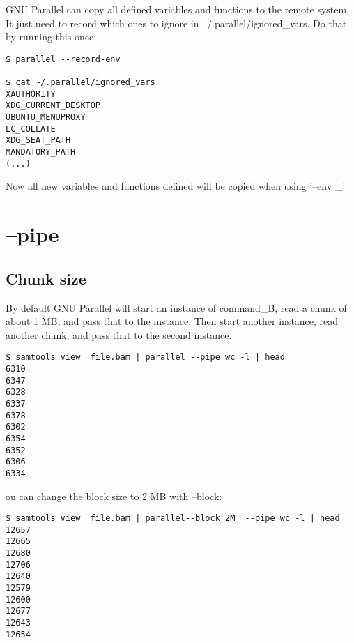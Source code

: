 \documentclass{article}
\begin{document}
GNU Parallel can copy all defined variables and functions to the remote system. It just need to record which ones to ignore in ~/.parallel/ignored\_vars. Do that by running this once:
\begin{lstlisting}
$ parallel --record-env

$ cat ~/.parallel/ignored_vars 
XAUTHORITY
XDG_CURRENT_DESKTOP
UBUNTU_MENUPROXY
LC_COLLATE
XDG_SEAT_PATH
MANDATORY_PATH
(...)
\end{lstlisting}
Now all new variables and functions defined will be copied when using  '--env \_'

%

\section{--pipe}
\subsection{Chunk size}
By default GNU Parallel will start an instance of command\_B, read a chunk of about 1 MB, and pass that to the instance. Then start another instance, read another chunk, and pass that to the second instance.
\begin{lstlisting}
$ samtools view  file.bam | parallel --pipe wc -l | head
6310
6347
6328
6337
6378
6302
6354
6352
6306
6334
\end{lstlisting}
ou can change the block size to 2 MB with --block:
\begin{lstlisting}
$ samtools view  file.bam | parallel--block 2M  --pipe wc -l | head
12657
12665
12680
12706
12640
12579
12600
12677
12643
12654
\end{lstlisting}
\end{document}
